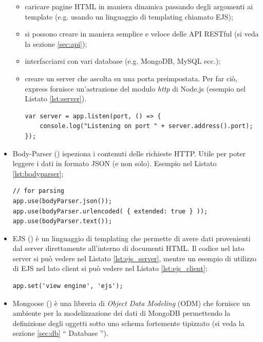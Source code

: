 \documentclass[12pt]{report}
\begin{document}
\begin{itemize}
\begin{itemize}
		\item caricare pagine HTML in maniera dinamica passando degli argomenti ai template (e.g. usando un linguaggio di templating chiamato EJS);
		\item si possono creare in maniera semplice e veloce delle API RESTful (si veda la sezione \ref{sec:api});
		\item interfacciarsi con vari database (e.g. MongoDB, MySQL ecc.);
		\item creare un server che ascolta su una porta preimpostata. Per far ciò, express fornisce un'astrazione del modulo \emph{http} di Node.js (esempio nel Listato \ref{lst:server}).
\begin{lstlisting}[caption={Creazione di un server con il modulo \emph{express}}, label={lst:server}, xleftmargin=\dimexpr-\leftmarginii-\leftmargini]
var server = app.listen(port, () => {
	console.log("Listening on port " + server.address().port);
});
\end{lstlisting}   

	\end{itemize}

	\item Body-Parser (\cite{bodyparser}) ispeziona i contenuti delle richieste HTTP. Utile per poter leggere i dati in formato JSON (e non solo). Esempio nel Listato \ref{lst:bodyparser};
\begin{lstlisting}[caption={Uso del modulo body-parser. Vengono definiti dei middleware che analizzano i contenuti delle richieste HTTP.}, label={lst:bodyparser}, xleftmargin=\dimexpr-\leftmargini]
// for parsing
app.use(bodyParser.json()); 
app.use(bodyParser.urlencoded( { extended: true } )); 
app.use(bodyParser.text()); 
\end{lstlisting}

	\item EJS (\cite{ejs}) è un linguaggio di templating che permette di avere dati provenienti dal server direttamente all'interno di documenti HTML. Il codice nel lato server si può vedere nel Listato \ref{lst:ejs_server}, mentre un esempio di utilizzo di EJS nel lato client si può vedere nel Listato \ref{lst:ejs_client};
\begin{lstlisting}[caption={Impostazione del \textquotedblleft{} view engine \textquotedblright{}}, label={lst:ejs_server}, xleftmargin=\dimexpr-\leftmargini]
app.set('view engine', 'ejs');
\end{lstlisting}

	\item Mongoose (\cite{mongoose}) è una libreria di \emph{Object Data Modeling} (ODM) che fornisce un ambiente per la modelizzazione dei dati di MongoDB permettendo la definizione degli oggetti sotto uno schema fortemente tipizzato (si veda la sezione \ref{sec:db} \textquotedblleft{} Database \textquotedblright{}).	
	
\end{itemize}
\end{document}
